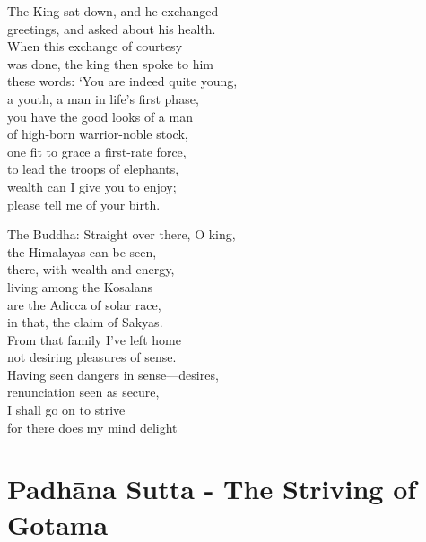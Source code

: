 \begin{MyDescription}{}
The King sat down, and he exchanged\\
greetings, and asked about his health.\\
When this exchange of courtesy\\
was done, the king then spoke to him\\
these words: `You are indeed quite young,\\
a youth, a man in life's ﬁrst phase,\\
you have the good looks of a man\\
of high-born warrior-noble stock,\\
one ﬁt to grace a ﬁrst-rate force,\\
to lead the troops of elephants,\\
wealth can I give you to enjoy;\\
please tell me of your birth.
\end{MyDescription}

\begin{MyDescription}[]{The Buddha:}
Straight over there, O king,\\
the Himalayas can be seen,\\
there, with wealth and energy,\\
living among the Kosalans\\
are the Adicca of solar race,\\
in that, the claim of Sakyas.\\
From that family I've left home\\
not desiring pleasures of sense.\\
Having seen dangers in sense—desires,\\
renunciation seen as secure,\\
I shall go on to strive\\
for there does my mind delight
\end{MyDescription}

\begin{MyDescription}[(Sn.405-424)]{}

\end{MyDescription}


\chapter{Padh\=ana Sutta - The Striving of Gotama}

